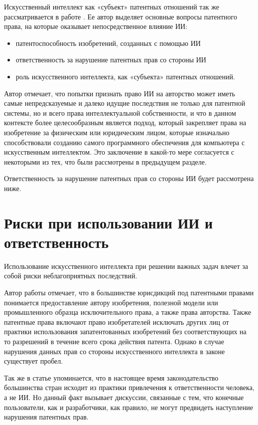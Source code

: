 Искусственный интеллект как «субъект» патентных отношений так же рассматривается в работе \cite{reg}.
Ее автор выделяет основные вопросы патентного права, на которые оказывает непосредственное влияние ИИ:

\begin{itemize}
\item патентоспособность изобретений, созданных с помощью ИИ
\item ответственность за нарушение патентных прав со стороны ИИ
\item роль искусственного интеллекта, как «субъекта» патентных отношений.
\end{itemize}

Автор отмечает, что попытки признать право ИИ на авторство может иметь самые непредсказуемые
и далеко идущие последствия не только для патентной системы, но и всего права интеллектуальной
собственности,  и что в данном контексте более целесообразным является подход, который закрепляет
права на изобретение за физическим или юридическим лицом, которые изначально способствовали созданию
самого программного обеспечения для компьютера с искусственным интеллектом. Это заключение в какой-то мере
согласуется с некоторыми из тех, что были рассмотрены в предыдущем разделе.

Ответственность за нарушение патентных прав со стороны ИИ будет рассмотрена ниже.

\newpage

\section{Риски при использовании ИИ и ответственность}
Использование искусственного интеллекта при решении важных задач влечет за собой риски неблагоприятных
последствий.

Автор работы \cite{reg} отмечает, что в большинстве юрисдикций под патентными правами понимается
предоставление автору изобретения, полезной модели или промышленного образца исключительного права,
а также права авторства. Также патентные права включают право изобретателей исключать других лиц
от практики использования запатентованных изобретений без соответствующих на то разрешений в течение
всего срока действия патента. Однако в случае нарушения данных прав со стороны искусственного
интеллекта в законе существует пробел.

Так же в статье \cite{reg} упоминается, что в настоящее время
законодательство большинства стран исходит из практики привлечения к ответственности человека, а не ИИ.
Но данный факт вызывает дискуссии, связанные с тем, что конечные пользователи, как и разработчики, как правило,
не могут предвидеть наступление нарушения патентных прав.


